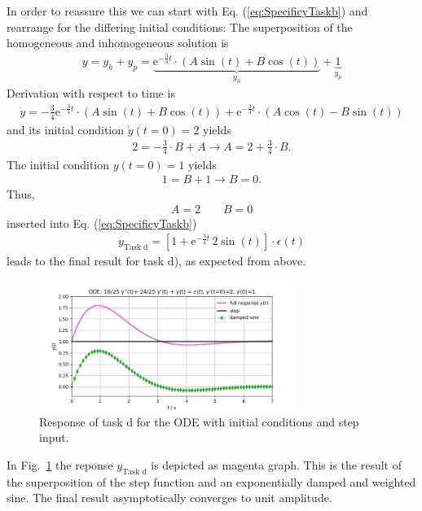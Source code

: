 \documentclass[a4paper,11pt,oneside]{scrartcl}
\newcommand{\eq}[1]{Eq. (\ref{#1})}
\begin{document}
In order to reassure this we can start with \eq{eq:SpecificyTaskb} and
rearrange for the differing initial conditions: The superposition of the
homogeneous and inhomogeneous solution is
\begin{align}
y = y_h + y_p = \underbrace{
\mathrm{e}^{-\frac{3}{4} t} \cdot
\left( A \sin(t) + B \cos(t)\right)}_{y_h} + \underbrace{1}_{y_p}
\end{align}
Derivation with respect to time is
\begin{align}
\dot{y}
=
-\frac{3}{4}\mathrm{e}^{-\frac{3}{4} t} \cdot
\left( A \sin(t) + B \cos(t)\right)
+
\mathrm{e}^{-\frac{3}{4} t} \cdot
\left( A \cos(t)  - B \sin(t)\right)
\end{align}
and its initial condition $\dot{y}(t=0) = 2$ yields
\begin{align}
2 = -\frac{3}{4}\cdot B + A \rightarrow A = 2 +  \frac{3}{4}\cdot B.
\end{align}
The initial condition ${y}(t=0) = 1$ yields
\begin{align}
1 = B  + 1 \rightarrow B = 0.
\end{align}
Thus,
\begin{align}
A = 2\qquad B = 0
\end{align}
inserted into \eq{eq:SpecificyTaskb}
\begin{align}
\boxed{
y_\text{Task d} =
[1+\mathrm{e}^{-\frac{3}{4} t}
\, 2 \sin(t)] \cdot \epsilon(t)
}
\end{align}
leads to the final result for task d), as expected from above.
%
\begin{figure}[b!]
\centering
\includegraphics[width=0.75\textwidth]{response_full}
\caption{Response of task d for the ODE with initial conditions and step input.}
\label{fig:response_full}
\end{figure}
%
In Fig.~\ref{fig:response_full} the reponse $y_\text{Task d} $ is depicted as
magenta graph. This is the result of the superposition of the step function and
an exponentially damped and weighted sine.
The final result asymptotically converges to unit amplitude.
\end{document}
